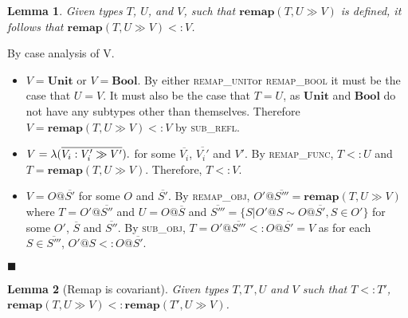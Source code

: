 \documentclass[preprint]{sigplanconf}
\newtheorem{lem}{Lemma}
\newcommand{\subrefl}{\textsc{sub\_refl}}
\newcommand{\subobj}{\textsc{sub\_obj}}
\newcommand{\remapunit}{\textsc{remap\_unit}}
\newcommand{\remapbool}{\textsc{remap\_bool}}
\newcommand{\remapfunc}{\textsc{remap\_func}}
\newcommand{\remapobj}{\textsc{remap\_obj}}
\newcommand{\remapapp}[3]{\ensuremath{\mathbf{remap}(#1, #2 \gg #3)}}
\newcommand{\unitt}{\mathbf{Unit}}
\newcommand{\boolt}{\mathbf{Bool}}
\newcommand{\funv}[4]{\lambda(\overline{#1 : #2 \gg #3}).#4}
\newcommand{\qed}{$\blacksquare$}
\newenvironment{proof}{\vspace{1ex}\noindent{\bf Proof}\hspace{0.5em}}
  {\hfill\qed\vspace{1ex}}
\begin{document}

\begin{lem}
\label{lem:remap}
Given types $T$, $U$, and $V$, such that
$\remapapp{T}{U}{V}$ is defined, it follows that $\remapapp{T}{U}{V} <: V$.
\end{lem}
\begin{proof}
By case analysis of V.

\begin{itemize}
\item $V = \unitt$ or $V = \boolt$. By either \remapunit or \remapbool
it must be the case that $U = V$. It must also be the case that
$T = U$, as $\unitt$ and $\boolt$ do not have any subtypes other than
themselves. Therefore $V = \remapapp{T}{U}{V} <: V$ by \subrefl.

\item $V = \funv{V_i}{V_i'}{V'}$ for some $\overline{V_i}$, $\overline{V_i'}$
and $V'$. By \remapfunc, $T <: U$ and $T = \remapapp{T}{U}{V}$. Therefore,
$T <: V$.

\item $V = O@\overline{S'}$ for some $O$ and $\overline{S'}$. By
\remapobj, $O'@\overline{S'''} = \remapapp{T}{U}{V}$ where 
$T = O'@\overline{S''}$ and $U = O@\overline{S}$ and
$\overline{S'''} = \{ S | O'@S \sim O@\overline{S'}, S \in O' \}$ 
for some $O'$, $\overline{S}$ and $\overline{S''}$. By \subobj,
$T = O'@\overline{S'''} <: O@\overline{S'} = V$ as for each $S \in \overline{S'''}$,
$O'@S <: O@\overline{S'}$.
\end{itemize}
\end{proof}


\begin{lem}[Remap is covariant]
\label{lem:remapcv}
Given types $T, T', U$ and $V$ such that $T <: T'$, 
$\remapapp{T}{U}{V} <: \remapapp{T'}{U}{V}$.
\end{lem}
\end{document}
